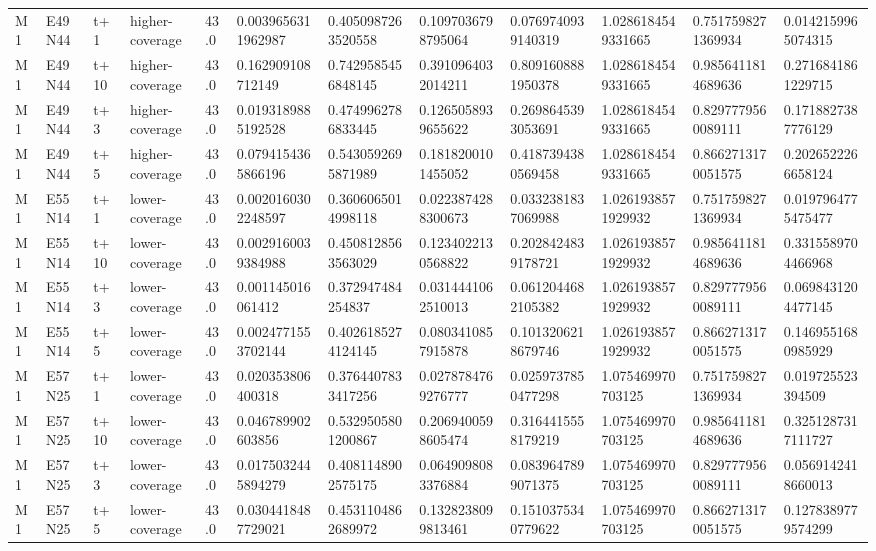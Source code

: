 \begin{landscape}
\begin{longtable}{llllllllllll}
M1 & E49N44 & t+1 & higher-coverage & 43.0 & 0.0039656311962987 & 0.4050987263520558 & 0.1097036798795064 & 0.0769740939140319 & 1.0286184549331665 & 0.7517598271369934 & 0.0142159965074315 \\
M1 & E49N44 & t+10 & higher-coverage & 43.0 & 0.162909108712149 & 0.7429585456848145 & 0.3910964032014211 & 0.8091608881950378 & 1.0286184549331665 & 0.9856411814689636 & 0.2716841861229715 \\
M1 & E49N44 & t+3 & higher-coverage & 43.0 & 0.0193189885192528 & 0.4749962786833445 & 0.1265058939655622 & 0.2698645393053691 & 1.0286184549331665 & 0.8297779560089111 & 0.1718827387776129 \\
M1 & E49N44 & t+5 & higher-coverage & 43.0 & 0.0794154365866196 & 0.5430592695871989 & 0.1818200101455052 & 0.4187394380569458 & 1.0286184549331665 & 0.8662713170051575 & 0.2026522266658124 \\
M1 & E55N14 & t+1 & lower-coverage & 43.0 & 0.0020160302248597 & 0.3606065014998118 & 0.0223874288300673 & 0.0332381837069988 & 1.0261938571929932 & 0.7517598271369934 & 0.0197964775475477 \\
M1 & E55N14 & t+10 & lower-coverage & 43.0 & 0.0029160039384988 & 0.4508128563563029 & 0.1234022130568822 & 0.2028424839178721 & 1.0261938571929932 & 0.9856411814689636 & 0.3315589704466968 \\
M1 & E55N14 & t+3 & lower-coverage & 43.0 & 0.001145016061412 & 0.372947484254837 & 0.0314441062510013 & 0.0612044682105382 & 1.0261938571929932 & 0.8297779560089111 & 0.0698431204477145 \\
M1 & E55N14 & t+5 & lower-coverage & 43.0 & 0.0024771553702144 & 0.4026185274124145 & 0.0803410857915878 & 0.1013206218679746 & 1.0261938571929932 & 0.8662713170051575 & 0.1469551680985929 \\
M1 & E57N25 & t+1 & lower-coverage & 43.0 & 0.020353806400318 & 0.3764407833417256 & 0.0278784769276777 & 0.0259737850477298 & 1.075469970703125 & 0.7517598271369934 & 0.019725523394509 \\
M1 & E57N25 & t+10 & lower-coverage & 43.0 & 0.046789902603856 & 0.5329505801200867 & 0.2069400598605474 & 0.3164415558179219 & 1.075469970703125 & 0.9856411814689636 & 0.3251287317111727 \\
M1 & E57N25 & t+3 & lower-coverage & 43.0 & 0.0175032445894279 & 0.4081148902575175 & 0.0649098083376884 & 0.0839647899071375 & 1.075469970703125 & 0.8297779560089111 & 0.0569142418660013 \\
M1 & E57N25 & t+5 & lower-coverage & 43.0 & 0.0304418487729021 & 0.4531104862689972 & 0.1328238099813461 & 0.1510375340779622 & 1.075469970703125 & 0.8662713170051575 & 0.1278389779574299 \\

\end{longtable}
\end{landscape}
